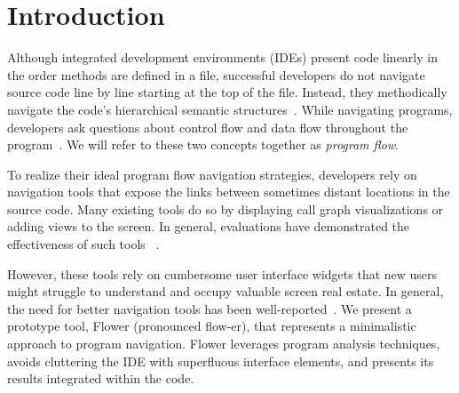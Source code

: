 \documentclass[conference]{IEEEtran}
\begin{document}



\IEEEpeerreviewmaketitle


\section{Introduction}
%

Although integrated development environments (IDEs) present code linearly in the order methods are defined in a file, successful developers do not navigate source code line by line starting at the top of the file. 
Instead, they methodically navigate the code's hierarchical semantic structures~\cite{robillard2004investigate}.
While navigating programs, developers ask questions about control flow and data flow throughout the program~\cite{latoza2010hard, Smith2015}. 
We will refer to these two concepts together as \textit{program flow}. 

To realize their ideal program flow navigation strategies, developers rely on navigation tools that expose the links between sometimes distant locations in the source code. 
Many existing tools do so by displaying call graph visualizations or adding views to the screen.
In general, evaluations have demonstrated the effectiveness of such tools ~\cite{Reacher,Whyline,Relo,Stacksplorer}.

However, these tools rely on cumbersome user interface widgets that new users might struggle to understand and occupy valuable screen real estate.
In general, the need for better navigation tools has been well-reported~\cite{ko2006seekInfo}.
We present a prototype tool, Flower (pronounced flow-er), that represents a minimalistic approach to program navigation.
Flower  leverages program analysis techniques, avoids cluttering the IDE with superfluous interface elements, and presents its results integrated within the code.
\end{document}
